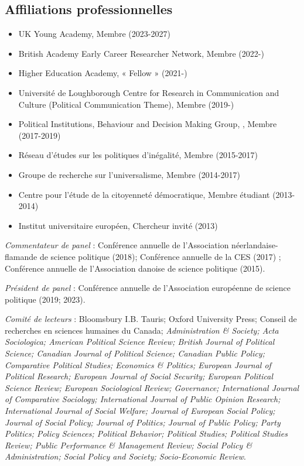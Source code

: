 \documentclass[letterpaper,fontsize=10.5pt]{scrartcl}
\begin{document}
\subsection{Affiliations professionnelles}
\vspace{-.25em}
\begin{itemize}[itemsep=0em, topsep=0em, partopsep=0em]
	\item UK Young Academy, Membre (2023-2027)
	\item British Academy Early Career Researcher Network, Membre (2022-)
	\item Higher Education Academy, « Fellow » (2021-)
	\item Université de Loughborough Centre for Research in Communication and Culture (Political Communication Theme), Membre (2019-)
	\item Political Institutions, Behaviour and Decision Making Group, , Membre (2017-2019)
	\item Réseau d’études sur les politiques d'inégalité, Membre (2015-2017)
	\item Groupe de recherche sur l'universalisme, Membre (2014-2017)
	\item Centre pour l’étude de la citoyenneté démocratique, Membre étudiant (2013-2014)
	\item Institut universitaire européen, Chercheur invité (2013)\\
\end{itemize}

{}\textit{Commentateur de panel} : Conférence annuelle de l'Association néerlandaise-flamande de science politique (2018); Conférence annuelle de la CES (2017) ; Conférence annuelle de l'Association danoise de science politique (2015).\\ 
\hfill \break
{}
{}\textit{Président de panel} : Conférence annuelle de l'Association européenne de science politique (2019; 2023).\\ 
\hfill \break
{}
{}\textit{Comité de lecteurs} : Bloomsbury I.B. Tauris; Oxford University Press; Conseil de recherches en sciences humaines du Canada; \textit{Administration \& Society; Acta Sociologica; American Political Science Review; British Journal of Political Science; Canadian Journal of Political Science; Canadian Public Policy; Comparative Political Studies; Economics \& Politics; European Journal of Political Research; European Journal of Social Security; European Political Science Review; European Sociological Review; Governance; International Journal of Comparative Sociology; International Journal of Public Opinion Research; International Journal of Social Welfare; Journal of European Social Policy; Journal of Social Policy; Journal of Politics; Journal of Public Policy; Party Politics; Policy Sciences; Political Behavior; Political Studies; Political Studies Review; Public Performance \& Management Review; Social Policy \& Administration; Social Policy and Society; Socio-Economic Review}.
\end{document}
